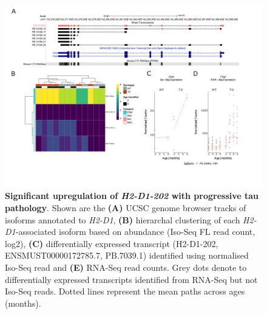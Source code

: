 \begin{landscape}
	\begin{figure}[!htp]
		\centering
		\includegraphics[page=2,trim={1.5cm 3.5cm 2cm 1cm}, scale = 0.85]{Figures/Ch5_DiffPlots_Landscape.pdf}
		\captionsetup{width=1.5\textwidth}
		\caption[Differential Isoform Expression: \textit{H2-D1}]%
		{\textbf{Significant upregulation of \textit{H2-D1-202} with progressive tau pathology}. Shown are the \textbf{(A)} UCSC genome browser tracks of isoforms annotated to \textit{H2-D1}, \textbf{(B)} hierarchal clustering of each \textit{H2-D1}-associated isoform based on abundance (Iso-Seq FL read count, log2), \textbf{(C)} differentially expressed transcript (H2-D1-202, ENSMUST00000172785.7, PB.7039.1) identified using normalised Iso-Seq read and \textbf{(E)} RNA-Seq read counts. Grey dots denote to differentially expressed transcripts identified from RNA-Seq but not Iso-Seq reads. Dotted lines represent the mean paths across ages (months).}   
		\label{fig:H2D1}
	\end{figure}	
\end{landscape}

